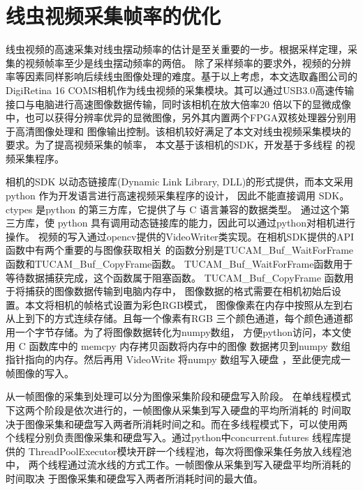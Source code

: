 \section{线虫视频采集帧率的优化}
	线虫视频的高速采集对线虫摆动频率的估计是至关重要的一步。根据采样定理，采集的视频帧率至少是线虫摆动频率的两倍。
	除了采样频率的要求外，视频的分辨率等因素同样影响后续线虫图像处理的难度。基于以上考虑，本文选取鑫图公司的DigiRetina 16
	 COMS相机作为线虫视频的采集模块。其可以通过USB3.0高速传输接口与电脑进行高速图像数据传输，同时该相机在放大倍率20
	 倍以下的显微成像中，也可以获得分辨率优异的显微图像，另外其内置两个FPGA双核处理器分别用于高清图像处理和
	 图像输出控制。该相机较好满足了本文对线虫视频采集模块的要求。为了提高视频采集的帧率，
	 本文基于该相机的SDK，开发基于多线程
	 的视频采集程序。
	 
	相机的SDK 以动态链接库(Dynamic Link Library, DLL)的形式提供，而本文采用 python 作为开发语言进行高速视频采集程序的设计，
	因此不能直接调用 SDK。ctypes 是python 的第三方库，它提供了与 C 语言兼容的数据类型。
	通过这个第三方库，使 python 具有调用动态链接库的能力，因此可以通过python对相机进行操作。
	视频的写入通过opencv提供的VideoWriter类实现。在相机SDK提供的API函数中有两个重要的与图像获取相关
	的函数分别是TUCAM\_Buf\_WaitForFrame 函数和TUCAM\_Buf\_CopyFrame函数。
	TUCAM\_Buf\_WaitForFrame函数用于等待数据捕获完成，这个函数属于阻塞函数。
	TUCAM\_Buf\_CopyFrame 函数用于将捕获的图像数据传输到电脑内存中，
	图像数据的格式需要在相机初始后设置。本文将相机的帧格式设置为彩色RGB模式，
	图像像素在内存中按照从左到右从上到下的方式连续存储。且每一个像素有RGB
	三个颜色通道，每个颜色通道都用一个字节存储。为了将图像数据转化为numpy数组，
	方便python访问，本文使用 C 函数库中的 memcpy 内存拷贝函数将内存中的图像
	数据拷贝到numpy 数组指针指向的内存。然后再用 VideoWrite 将numpy 数组写入硬盘
	，至此便完成一帧图像的写入。
	
	从一帧图像的采集到处理可以分为图像采集阶段和硬盘写入阶段。
	在单线程模式下这两个阶段是依次进行的，一帧图像从采集到写入硬盘的平均所消耗的
	时间取决于图像采集和硬盘写入两者所消耗时间之和。而在多线程模式下，可以使用两
	个线程分别负责图像采集和硬盘写入。通过python中concurrent.futures 线程库提供的
	ThreadPoolExecutor模块开辟一个线程池，每次将图像采集任务放入线程池中，
	两个线程通过流水线的方式工作。一帧图像从采集到写入硬盘平均所消耗的时间取决
	于图像采集和硬盘写入两者所消耗时间的最大值。
	
